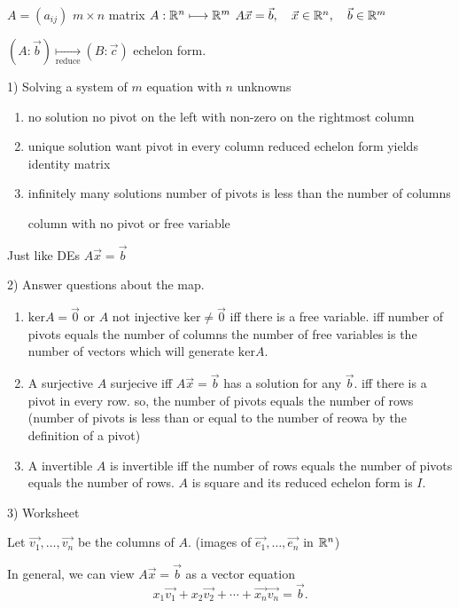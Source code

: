 
$A=(a_{ij})$  $m\times n$ matrix
$A:\mathbb{R}^{n}\longmapsto\mathbb{R}^{m}$ 
$A\vec{x}=\vec{b},\quad \vec{x} \in \mathbb{R}^{n}, \quad \vec{b} \in  \mathbb{R}^{m}$ 

$(A:\vec{b})\underset{\text{reduce}}{\longmapsto}(B:\vec{c})$ echelon form.

1) Solving a system of $m$ equation with $n$ unknowns
\begin{enumerate}[label=(\alph*)]
  \item no solution
    no pivot on the left with non-zero on the rightmost column
  \item unique solution
    want pivot in every column
    reduced echelon form yields identity matrix
  \item infinitely many solutions
    number of pivots is less than the number of columns
    
    column with no pivot or free variable

\end{enumerate}

Just like DEs
$A\vec{x}=\vec{b}$ 

2) Answer questions about the map.
\begin{enumerate}
  \item $\text{ker}A={\vec{0}}$ or $A$ not injective
$\text{ker}\ne{\vec{0}}$ iff there is a free variable.
iff number of pivots equals the number of columns
the number of free variables is the number of vectors which will generate $\text{ker}A$.


  \item A surjective
    $A$ surjecive iff $A\vec{x}=\vec{b}$ has a solution for any $\vec{b}$.
iff there is a pivot in every row.
so, the number of pivots equals the number of rows
(number of pivots is less than or equal to the number of reowa by the definition of a pivot)
  \item A invertible
    $A$ is invertible iff the number of rows equals the number of pivots equals the number of rows.
     $A$ is square and its reduced echelon form is $I$.
\end{enumerate}


3) Worksheet

Let $\vec{v_1},\ldots,\vec{v_n}$ be the columns of $A$.
(images of $\vec{e_1},\ldots,\vec{e_n}$ in $\mathbb{R}^{n}$)

In general, we can view $A\vec{x}=\vec{b}$ as a vector equation
 \[
x_1\vec{v_1}+x_2\vec{v_2}+\cdots+\vec{x_n}\vec{v_n}=\vec{b}
.\] 

